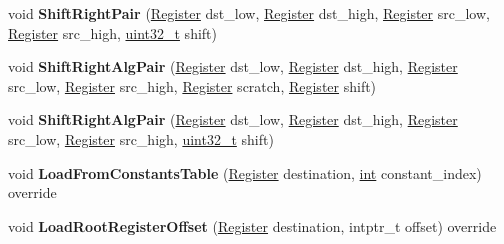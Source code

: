 \begin{DoxyCompactItemize}
\item 
\mbox{\label{classv8_1_1internal_1_1TurboAssembler_a937ceb5cbf771b25ced1cce6155f4fe6}} 
void {\bfseries Shift\+Right\+Pair} (\mbox{\hyperlink{classv8_1_1internal_1_1Register}{Register}} dst\+\_\+low, \mbox{\hyperlink{classv8_1_1internal_1_1Register}{Register}} dst\+\_\+high, \mbox{\hyperlink{classv8_1_1internal_1_1Register}{Register}} src\+\_\+low, \mbox{\hyperlink{classv8_1_1internal_1_1Register}{Register}} src\+\_\+high, \mbox{\hyperlink{classuint32__t}{uint32\+\_\+t}} shift)
\item 
\mbox{\label{classv8_1_1internal_1_1TurboAssembler_a5047d0f6dd51fc5ecc7cfcf267c7ac00}} 
void {\bfseries Shift\+Right\+Alg\+Pair} (\mbox{\hyperlink{classv8_1_1internal_1_1Register}{Register}} dst\+\_\+low, \mbox{\hyperlink{classv8_1_1internal_1_1Register}{Register}} dst\+\_\+high, \mbox{\hyperlink{classv8_1_1internal_1_1Register}{Register}} src\+\_\+low, \mbox{\hyperlink{classv8_1_1internal_1_1Register}{Register}} src\+\_\+high, \mbox{\hyperlink{classv8_1_1internal_1_1Register}{Register}} scratch, \mbox{\hyperlink{classv8_1_1internal_1_1Register}{Register}} shift)
\item 
\mbox{\label{classv8_1_1internal_1_1TurboAssembler_ab3c78d8269a5f169e9f52d56659b8c2f}} 
void {\bfseries Shift\+Right\+Alg\+Pair} (\mbox{\hyperlink{classv8_1_1internal_1_1Register}{Register}} dst\+\_\+low, \mbox{\hyperlink{classv8_1_1internal_1_1Register}{Register}} dst\+\_\+high, \mbox{\hyperlink{classv8_1_1internal_1_1Register}{Register}} src\+\_\+low, \mbox{\hyperlink{classv8_1_1internal_1_1Register}{Register}} src\+\_\+high, \mbox{\hyperlink{classuint32__t}{uint32\+\_\+t}} shift)
\item 
\mbox{\label{classv8_1_1internal_1_1TurboAssembler_a6c8fae865ac1fd7f79f9d4934a46392a}} 
void {\bfseries Load\+From\+Constants\+Table} (\mbox{\hyperlink{classv8_1_1internal_1_1Register}{Register}} destination, \mbox{\hyperlink{classint}{int}} constant\+\_\+index) override
\item 
\mbox{\label{classv8_1_1internal_1_1TurboAssembler_a20588856c39f30350ccd570332e761ea}} 
void {\bfseries Load\+Root\+Register\+Offset} (\mbox{\hyperlink{classv8_1_1internal_1_1Register}{Register}} destination, intptr\+\_\+t offset) override

\end{DoxyCompactItemize}
